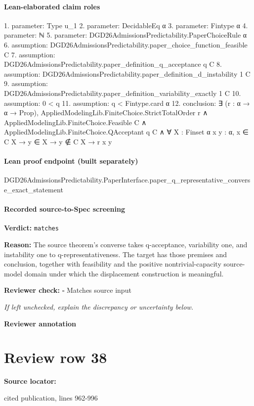 \documentclass[10pt]{article}
\newcommand{\reviewerbox}{%
  \par\noindent\fbox{\parbox{0.96\linewidth}{\rule{0pt}{0.38in}}}\par
}
\newcommand{\reviewmatch}[1]{%
  \par\noindent\textbf{Reviewer check:} $\square$\; #1\par
  \noindent\emph{If left unchecked, explain the discrepancy or uncertainty below.}\par
}
\begin{document}
\paragraph{Lean-elaborated claim roles}\begin{ReviewVerbatim}
1. parameter: Type u_1
2. parameter: DecidableEq α
3. parameter: Fintype α
4. parameter: ℕ
5. parameter: DGD26AdmissionsPredictability.PaperChoiceRule α
6. assumption: DGD26AdmissionsPredictability.paper_choice_function_feasible C
7. assumption: DGD26AdmissionsPredictability.paper_definition_q_acceptance q C
8. assumption: DGD26AdmissionsPredictability.paper_definition_d_instability 1 C
9. assumption: DGD26AdmissionsPredictability.paper_definition_variability_exactly 1 C
10. assumption: 0 < q
11. assumption: q < Fintype.card α
12. conclusion: ∃ (r : α → α → Prop),
  AppliedModelingLib.FiniteChoice.StrictTotalOrder r ∧
    AppliedModelingLib.FiniteChoice.Feasible C ∧
      AppliedModelingLib.FiniteChoice.QAcceptant q C ∧ ∀ {X : Finset α} {x y : α}, x ∈ C X → y ∈ X → y ∉ C X → r x y
\end{ReviewVerbatim}

\paragraph{Lean proof endpoint (built separately)}\begin{ReviewVerbatim}
DGD26AdmissionsPredictability.PaperInterface.paper_q_representative_converse_exact_statement
\end{ReviewVerbatim}

\paragraph{Recorded source-to-Spec screening}
\textbf{Verdict:} \texttt{matches}
\\
{\raggedright
\textbf{Reason:} The source theorem's converse takes q-\allowbreak{}acceptance, variability one, and instability one to q-\allowbreak{}representativeness.\allowbreak{} The target has those premises and conclusion, together with feasibility and the positive nontrivial-\allowbreak{}capacity source-\allowbreak{}model domain under which the displacement construction is meaningful.\allowbreak{}
\par}
\reviewmatch{Matches source input}
\noindent\textbf{Reviewer annotation}\par
\reviewerbox
\clearpage
\hypertarget{source-claim-5fcefe7f9430bc35}{}
\section*{Review row 38}
\textbf{Source locator:} {\footnotesize\raggedright cited publication, lines 962-\allowbreak{}996\par}
\end{document}
